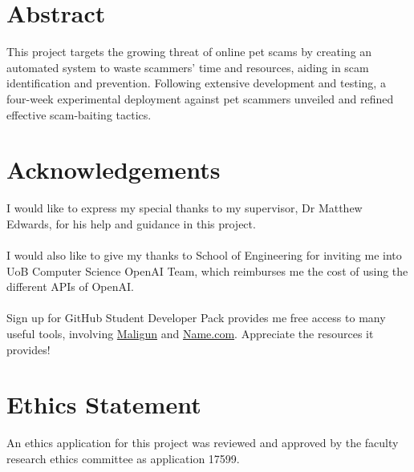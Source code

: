 \documentclass[ oneside,%
                    author={Cassie Qing Tang},
                    degree={BSc},
                     title={An Automated Response System for Disrupting Online Pet Scamming \\ },
                    subtitle={ }]{dissertation}
\begin{document}
\maketitle

\chapter*{Abstract}
This project targets the growing threat of online pet scams by creating an automated system to waste scammers' time and resources, aiding in scam identification and prevention. Following extensive development and testing, a four-week experimental deployment against pet scammers unveiled and refined effective scam-baiting tactics.

\chapter*{Acknowledgements}
I would like to express my special thanks to my supervisor, Dr Matthew Edwards, for his help and guidance in this project.
\\
\\
I would also like to give my thanks to School of Engineering for inviting me into UoB Computer Science OpenAI Team, which reimburses me the cost of using the different APIs of OpenAI.
\\
\\
Sign up for GitHub Student Developer Pack provides me free access to many useful tools, involving \href{https://www.mailgun.com}{Maligun} and \href{https://www.name.com}{Name.com}. Appreciate the resources it provides!

\makedecl


\tableofcontents
\listoffigures
\listoftables

\chapter*{Ethics Statement}
An ethics application for this project was reviewed and approved by the faculty research ethics committee as application 17599.
\end{document}
